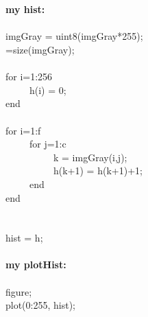     \\\\
    \raggedright{
    \textbf{my hist:}
    \\ \ \\
    imgGray = uint8(imgGray*255);
    \\ [f,c]=size(imgGray);
    \\
    \\ for i=1:256
    \\ \ \ \ \ \ h(i) = 0;
    \\ end
    \\
    \\ for i=1:f
       \\ \ \ \ \ \ for j=1:c
           \\ \ \ \ \ \ \ \ \ \ \ k = imgGray(i,j);
           \\ \ \ \ \ \ \ \ \ \ \ h(k+1) = h(k+1)+1;
       \\ \ \ \ \ \ end
    \\ end
    \\ \ \\
    \\ hist = h;}
    \\ \ \\
    \textbf{my plotHist:}
    \\ \ \\
    figure;
    \\ plot(0:255, hist);
    \\ \ \\
